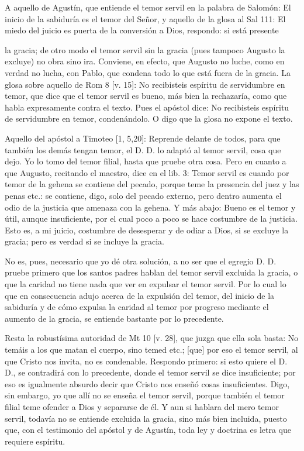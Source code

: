 A aquello de Agustín, que entiende el temor servil en la palabra de Salomón: El inicio de la sabiduría es el temor del Señor, y aquello de la glosa al Sal 111: El miedo del juicio es puerta de la conversión a Dios, respondo: si está presente

la gracia; de otro modo el temor servil sin la gracia (pues tampoco Augusto la excluye) no obra sino ira. Conviene, en efecto, que Augusto no luche, como en verdad no lucha, con Pablo, que condena todo lo que está fuera de la gracia. La glosa sobre aquello de Rom 8 [v. 15]: No recibisteis espíritu de servidumbre en temor, que dice que el temor servil es bueno, más bien la rechazaría, como que habla expresamente contra el texto. Pues el apóstol dice: No recibisteis espíritu de servidumbre en temor, condenándolo. O digo que la glosa no expone el texto.

Aquello del apóstol a Timoteo [1, 5,20]: Reprende delante de todos, para que también los demás tengan temor, el D. D. lo adaptó al temor servil, cosa que dejo. Yo lo tomo del temor filial, hasta que pruebe otra cosa. Pero en cuanto a que Augusto, recitando el maestro, dice en el lib. 3: Temor servil es cuando por temor de la gehena se contiene del pecado, porque teme la presencia del juez y las penas etc.: se contiene, digo, solo del pecado externo, pero dentro aumenta el odio de la justicia que amenaza con la gehena. Y más abajo: Bueno es el temor y útil, aunque insuficiente, por el cual poco a poco se hace costumbre de la justicia. Esto es, a mi juicio, costumbre de desesperar y de odiar a Dios, si se excluye la gracia; pero es verdad si se incluye la gracia.

No es, pues, necesario que yo dé otra solución, a no ser que el egregio D. D. pruebe primero que los santos padres hablan del temor servil excluida la gracia, o que la caridad no tiene nada que ver en expulsar el temor servil. Por lo cual lo que en consecuencia adujo acerca de la expulsión del temor, del inicio de la sabiduría y de cómo expulsa la caridad al temor por progreso mediante el aumento de la gracia, se entiende bastante por lo precedente.

Resta la robustísima autoridad de Mt 10 [v. 28], que juzga que ella sola basta: No temáis a los que matan el cuerpo, sino temed etc.; [que] por eso el temor servil, al que Cristo nos invita, no es condenable. Respondo primero: si esto quiere el D. D., se contradirá con lo precedente, donde el temor servil se dice insuficiente; por eso es igualmente absurdo decir que Cristo nos enseñó cosas insuficientes. Digo, sin embargo, yo que allí no se enseña el temor servil, porque también el temor filial teme ofender a Dios y separarse de él. Y aun si hablara del mero temor servil, todavía no se entiende excluida la gracia, sino más bien incluida, puesto que, con el testimonio del apóstol y de Agustín, toda ley y doctrina es letra que requiere espíritu.

